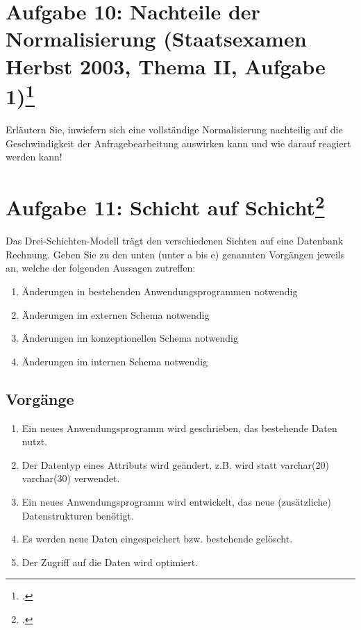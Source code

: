 \documentclass{lehramt-informatik}
\begin{document}
\section{Aufgabe 10: Nachteile der Normalisierung (Staatsexamen Herbst
2003, Thema II, Aufgabe 1)\footcite{db:ab:7}}

Erläutern Sie, inwiefern sich eine vollständige Normalisierung
nachteilig auf die Geschwindigkeit der Anfragebearbeitung auswirken kann
und wie darauf reagiert werden kann!

%

\section{Aufgabe 11: Schicht auf Schicht\footcite{db:ab:7}}

Das Drei-Schichten-Modell trägt den verschiedenen Sichten auf eine
Datenbank Rechnung. Geben Sie zu den unten (unter a bis e) genannten
Vorgängen jeweils an, welche
der folgenden Aussagen zutreffen:

\renewcommand{\labelenumi}{(\arabic{enumi})}
\begin{enumerate}
\item Änderungen in bestehenden Anwendungsprogrammen notwendig
\item Änderungen im externen Schema notwendig
\item Änderungen im konzeptionellen Schema notwendig
\item Änderungen im internen Schema notwendig
\end{enumerate}

\subsection{Vorgänge}

\renewcommand{\labelenumi}{(\alph{enumi})}
\begin{enumerate}


\item Ein neues Anwendungsprogramm wird geschrieben, das bestehende
Daten nutzt.


\item Der Datentyp eines Attributs wird geändert, z.B. wird statt
varchar(20) varchar(30) verwendet.


\item Ein neues Anwendungsprogramm wird entwickelt, das neue
(zusätzliche) Datenstrukturen benötigt.


\item Es werden neue Daten eingespeichert bzw. bestehende gelöscht.


\item Der Zugriff auf die Daten wird optimiert.
\end{enumerate}
\end{document}
